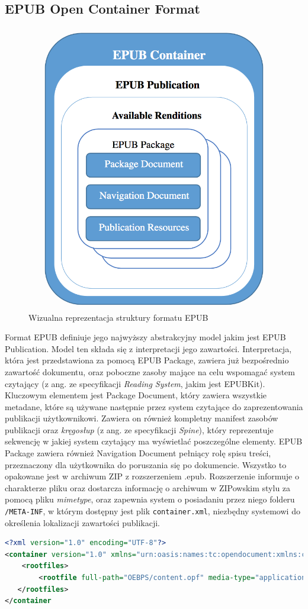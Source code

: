 \subsection{EPUB Open Container Format}

\begin{figure}[ht!]
  \centering
  \includegraphics[width=.4\linewidth]{images/chapter-3-image-1-structure.png}
  \caption{Wizualna reprezentacja struktury formatu EPUB\cite{EPUBSpecificationRoadMap}}
\end{figure}

Format EPUB definiuje jego najwyższy abstrakcyjny model jakim jest EPUB Publication. Model ten składa się z interpretacji jego zawartości. Interpretacja, która jest przedstawiona za pomocą EPUB Package, zawiera już bezpośrednio zawartość dokumentu, oraz poboczne zasoby mające na celu wspomagać system czytający (z ang. ze specyfikacji \textit{Reading System}, jakim jest EPUBKit). Kluczowym elementem jest Package Document, który zawiera wszystkie metadane, które są używane następnie przez system czytające do zaprezentowania publikacji użytkownikowi. Zawiera on również kompletny manifest zasobów publikacji oraz \textit{kręgosłup} (z ang. ze specyfikacji \textit{Spine}), który reprezentuje sekwencję w jakiej system czytający ma wyświetlać poszczególne elementy. EPUB Package zawiera również Navigation Document pełniący rolę spisu treści, przeznaczony dla użytkownika do poruszania się po dokumencie. Wszystko to opakowane jest w archiwum ZIP z rozszerzeniem .epub. Rozszerzenie informuje o charakterze pliku oraz dostarcza informację o archiwum w ZIPowskim stylu za pomocą pliku \textit{mimetype}, oraz zapewnia system o posiadaniu przez niego folderu \texttt{/META-INF}, w którym dostępny jest plik \texttt{container.xml}, niezbędny systemowi do określenia lokalizacji zawartości publikacji.

\begin{lstlisting}[caption={Przykładowy plik container.xml}, language=XML,label=abcd]
<?xml version="1.0" encoding="UTF-8"?>
<container version="1.0" xmlns="urn:oasis:names:tc:opendocument:xmlns:container">
    <rootfiles>
        <rootfile full-path="OEBPS/content.opf" media-type="application/oebps-package+xml"/>
   </rootfiles>
</container
\end{lstlisting}

